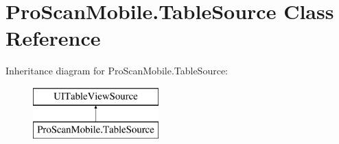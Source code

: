 \hypertarget{class_pro_scan_mobile_1_1_table_source}{\section{Pro\-Scan\-Mobile.\-Table\-Source Class Reference}
\label{class_pro_scan_mobile_1_1_table_source}
}
Inheritance diagram for Pro\-Scan\-Mobile.\-Table\-Source\-:\begin{figure}[H]
\begin{center}
\leavevmode
\includegraphics[height=2.000000cm]{class_pro_scan_mobile_1_1_table_source}
\end{center}
\end{figure}
